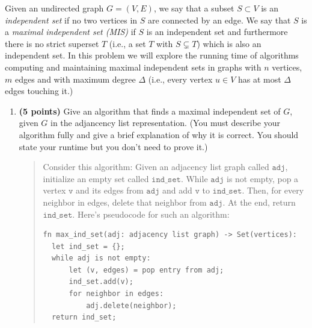 \documentclass[11pt]{article}
\begin{document}
\begin{enumerate}
Given an undirected graph $G = (V,E)$, we say that a subset $S\subset V$ is an \emph{independent set} if no two vertices in $S$ are connected by an edge. We say that $S$ is a \emph{maximal independent set (MIS)} if $S$ is an independent set and furthermore there is no strict superset $T$ (i.e., a set $T$ with $S \subsetneq T$) which is also an independent set. In this problem we will explore the running time of algorithms computing and maintaining maximal independent sets in graphs with $n$ vertices, $m$ edges and with maximum degree $\Delta$ (i.e., every vertex $u \in V$ has at most $\Delta$ edges touching it.) 



\begin{enumerate}
    \item {\bf (5 points)} Give an algorithm that finds a maximal independent set of $G$, given $G$ in the adjancency list representation. (You must describe your algorithm fully and give a brief explanation of why it is correct. You should state your runtime but you don't need to prove it.) 
    \begin{quote}
      \color{purple}
      Consider this algorithm: Given an adjacency list graph called $\texttt{adj}$, initialize an empty set called $\texttt{ind\_set}$. While $\texttt{adj}$ is not empty, pop a vertex $\texttt{v}$ and its edges from $\texttt{adj}$ and add $\texttt{v}$ to $\texttt{ind\_set}$. Then, for every neighbor in edges, delete that neighbor from $\texttt{adj}$. At the end, return $\texttt{ind\_set}$. Here's pseudocode for such an algorithm:
      \begin{verbatim}
fn max_ind_set(adj: adjacency list graph) -> Set(vertices):
  let ind_set = {};
  while adj is not empty:
      let (v, edges) = pop entry from adj;
      ind_set.add(v);
      for neighbor in edges:
          adj.delete(neighbor);
  return ind_set;
      \end{verbatim}
      

\end{quote}
\end{enumerate}
\end{enumerate}
\end{document}
